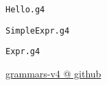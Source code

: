 \begin{frame}{}
\end{frame}

\begin{frame}{}
  \begin{center}
    \texttt{Hello.g4}

    \vspace{0.80cm}
    \texttt{SimpleExpr.g4}

    \vspace{0.80cm}
    \texttt{Expr.g4}

    \pause
    \vspace{1.50cm}
    \href{https://github.com/antlr/grammars-v4}{grammars-v4 @ github}
  \end{center}
\end{frame}
